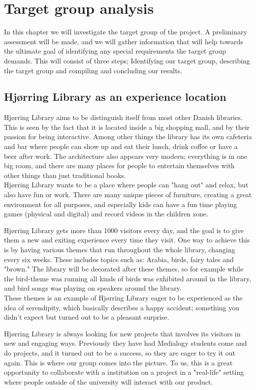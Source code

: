 \chapter{Target group analysis}
In this chapter we will investigate the target group of the project. A preliminary assessment will be made, and we will gather information that will help towards the ultimate goal of identifying any special requirements the target group demands. This will consist of three steps; Identifying our target group, describing the target group and compiling and concluding our results.

\section{Hj{\o}rring Library as an experience location}
Hj{\o}rring Library aims to be distinguish itself from most other Danish libraries. This is seen by the fact that it is located inside a big shopping mall, and by their passion for being interactive. Among other things the library has its own cafeteria and bar where people can show up and eat their lunch, drink coffee or have a beer after work. The architecture also appears very modern; everything is in one big room, and there are many places for people to entertain themselves with other things than just traditional books. \\ Hj{\o}rring Library wants to be a place where people can "hang out" and relax, but also have fun or work. There are many unique pieces of furniture, creating a great environment for all purposes, and especially kids can have a fun time playing games (physical and digital) and record videos in the children zone.

Hj{\o}rring Library gets more than 1000 visitors every day, and the goal is to give them a new and exiting experience every time they visit. One way to achieve this is by having various themes that run throughout the whole library, changing every six weeks. These includes topics such as: Arabia, birds, fairy tales and "brown." The library will be decorated after these themes, so for example while the bird-theme was running all kinds of birds was exhibited around in the library, and bird songs was playing on speakers around the library.\\
These themes is an example of Hj{\o}rring Library eager to be experienced as the idea of serendipity, which basically describes a happy accident; something you didn't expect but turned out to be a pleasant surprise.

Hj{\o}rring Library is always looking for new projects that involves its visitors in new and engaging ways. Previously they have had Medialogy students come and do projects, and it turned out to be a success, so they are eager to try it out again. This is where our group comes into the picture. To us, this is a great opportunity to collaborate with a institution on a project in a "real-life" setting where people outside of the university will interact with our product.

